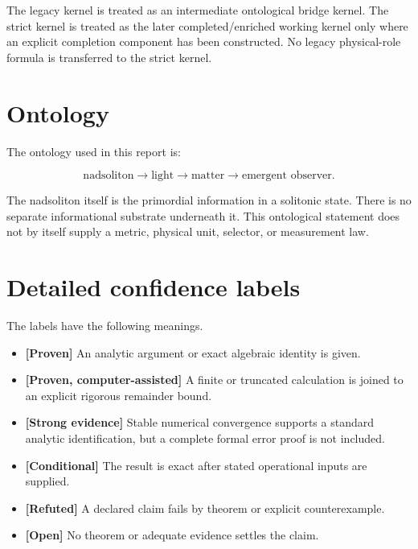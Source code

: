 \documentclass[11pt,a4paper,openany]{report}
\newcommand{\statusProven}{\textcolor{fingreen}{[Proven]}}
\newcommand{\statusComputer}{\textcolor{fingreen}{[Proven, computer-assisted]}}
\newcommand{\statusStrong}{\textcolor{finblue}{[Strong evidence]}}
\newcommand{\statusConditional}{\textcolor{finorange}{[Conditional]}}
\newcommand{\statusRefuted}{\textcolor{finred}{[Refuted]}}
\newcommand{\statusOpen}{\textcolor{finviolet}{[Open]}}
\begin{document}
The legacy kernel is treated as an intermediate ontological bridge kernel. The strict kernel is treated as the later completed/\allowbreak{}enriched working kernel only where an explicit completion component has been constructed. No legacy physical-role formula is transferred to the strict kernel.

\section{Ontology}

The ontology used in this report is:

\[
\text{nadsoliton}
\longrightarrow
\text{light}
\longrightarrow
\text{matter}
\longrightarrow
\text{emergent observer}.
\]

The nadsoliton itself is the primordial information in a solitonic state. There is no separate informational substrate underneath it. This ontological statement does not by itself supply a metric, physical unit, selector, or measurement law.

\section{Detailed confidence labels}

The labels have the following meanings.

\begin{itemize}
\item 
\textbf{\statusProven{}} An analytic argument or exact algebraic identity is given.

\item 
\textbf{\statusComputer{}} A finite or truncated calculation is joined to an explicit rigorous remainder bound.

\item 
\textbf{\statusStrong{}} Stable numerical convergence supports a standard analytic identification, but a complete formal error proof is not included.

\item 
\textbf{\statusConditional{}} The result is exact after stated operational inputs are supplied.

\item 
\textbf{\statusRefuted{}} A declared claim fails by theorem or explicit counterexample.

\item 
\textbf{\statusOpen{}} No theorem or adequate evidence settles the claim.

\end{itemize}
\end{document}
